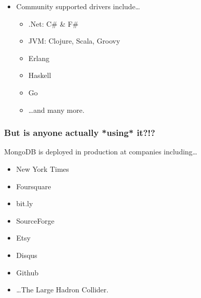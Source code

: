 \documentclass{beamer}
\newenvironment{itemizeframe}
               {\begin{frame}\startitemizeframe} 
               {\stopitemizeframe\end{frame}}
\newcommand\startitemizeframe{\begin{itemize}} \newcommand\stopitemizeframe{\end{itemize}}
\begin{document}
\begin{itemizeframe}
\begin{itemizeframe}
\begin{itemize}
        \item<2-> Python
        \item<2-> Ruby
    \end{itemize}
\item<3-> Community supported drivers include\ldots
    \begin{itemize}
        \item<3-> .Net: C\# \& F\#
        \item<3-> JVM: Clojure, Scala, Groovy
        \item<3-> Erlang
        \item<3-> Haskell
        \item<3-> Go 
        \item<3-> \ldots and many more.
    \end{itemize}
\end{itemizeframe}
\begin{frame}
\frametitle{But is anyone actually *using* it?!?}
    MongoDB is deployed in production at companies including\ldots
    \begin{itemize}
        \item New York Times 
        \item Foursquare 
        \item bit.ly 
        \item SourceForge
        \item Etsy 
        \item Disqus
        \item Github\pause
        \item \ldots The Large Hadron Collider.  
    \end{itemize}
\end{frame}


\end{itemizeframe}
\end{document}
